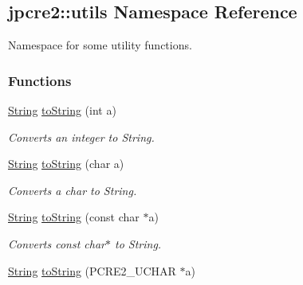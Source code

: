 \hypertarget{namespacejpcre2_1_1utils}{}\subsection{jpcre2\+:\+:utils Namespace Reference}
\label{namespacejpcre2_1_1utils}


Namespace for some utility functions.  


\subsubsection*{Functions}
\begin{DoxyCompactItemize}
\item 
\hyperlink{namespacejpcre2_a91f03070152fb228bc116c5a737f1d16}{String} \hyperlink{namespacejpcre2_1_1utils_a433f24d37008ed65f829be30aa0f2c73}{to\+String} (int a)\hypertarget{namespacejpcre2_1_1utils_a433f24d37008ed65f829be30aa0f2c73}{}\label{namespacejpcre2_1_1utils_a433f24d37008ed65f829be30aa0f2c73}

\begin{DoxyCompactList}\small\item\em Converts an integer to String. \end{DoxyCompactList}\item 
\hyperlink{namespacejpcre2_a91f03070152fb228bc116c5a737f1d16}{String} \hyperlink{namespacejpcre2_1_1utils_a8951a9c2c01a87cee04b55d0a032c73e}{to\+String} (char a)\hypertarget{namespacejpcre2_1_1utils_a8951a9c2c01a87cee04b55d0a032c73e}{}\label{namespacejpcre2_1_1utils_a8951a9c2c01a87cee04b55d0a032c73e}

\begin{DoxyCompactList}\small\item\em Converts a char to String. \end{DoxyCompactList}\item 
\hyperlink{namespacejpcre2_a91f03070152fb228bc116c5a737f1d16}{String} \hyperlink{namespacejpcre2_1_1utils_a67c67163e03c18ca3418f5f59f90b435}{to\+String} (const char $\ast$a)\hypertarget{namespacejpcre2_1_1utils_a67c67163e03c18ca3418f5f59f90b435}{}\label{namespacejpcre2_1_1utils_a67c67163e03c18ca3418f5f59f90b435}

\begin{DoxyCompactList}\small\item\em Converts const char$\ast$ to String. \end{DoxyCompactList}\item 
\hyperlink{namespacejpcre2_a91f03070152fb228bc116c5a737f1d16}{String} \hyperlink{namespacejpcre2_1_1utils_a84c5c4e28feda8b093d700a911d59c72}{to\+String} (P\+C\+R\+E2\+\_\+\+U\+C\+H\+AR $\ast$a)\hypertarget{namespacejpcre2_1_1utils_a84c5c4e28feda8b093d700a911d59c72}{}\label{namespacejpcre2_1_1utils_a84c5c4e28feda8b093d700a911d59c72}


\end{DoxyCompactItemize}
